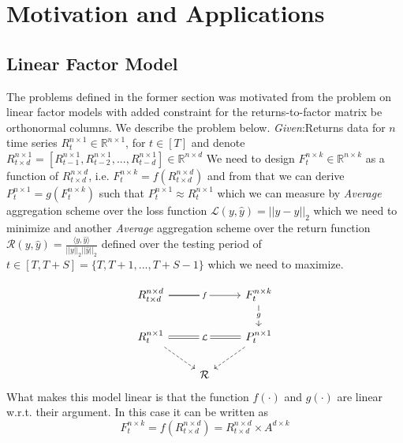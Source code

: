 \section{Motivation and Applications}

\subsection{Linear Factor Model}
The problems defined in the former section was motivated from the problem on linear factor models with added constraint for the returns-to-factor matrix be orthonormal columns. We describe the problem below.\newline
\textit{Given}:\newline Returns data for $n$ time series $R^{n\times 1}_t \in \mathbb{R}^{n\times 1}$, for $t\in [T]$ \newline
and denote $R^{n\times 1}_{t\times d} = [R^{n\times 1}_{t-1},R^{n\times 1}_{t-2},...,R^{n\times 1}_{t-d}] \in \mathbb{R}^{n\times d}$\newline
We need to design $F^{n\times k}_t \in \mathbb{R}^{n\times k}$ as a function of $R^{n\times d}_{t\times d}$, i.e. $F^{n\times k}_t = f(R^{n\times d}_{t\times d})$ and from that we can derive $P^{n \times 1}_{t} = g(F^{n\times k}_t)$ such that $P^{n \times 1}_{t} \approx R^{n \times 1}_{t}$ which we can measure by \textit{Average} aggregation scheme over the loss function $\mathcal{L}(y,\hat{y}) = ||y-\hat{y}||_2$ which we need to minimize and another \textit{Average} aggregation scheme over the return function $\mathcal{R}(y,\hat{y}) = \frac{\langle y,\hat{y}\rangle}{||y||_2||\hat{y}||_2}$ defined over the testing period of $t \in [T,T+S]= \{T,T+1,...,T+S-1\}$ which we need to maximize.

\begin{equation} \label{lfm_diagram}
\begin{tikzcd}
R^{n\times d}_{t \times d} \arrow[rr, "f" description] \arrow[r, no head]& {}& F^{n\times k}_{t} \arrow[d, "g" description] \\
R^{n\times 1}_t \arrow[rr, "\mathcal{L}" description, Rightarrow, no head] \arrow[rd, dashed] && P^{n \times 1}_{t} \arrow[ld, dashed]\\
& \mathcal{R} &
\end{tikzcd}
\end{equation}
\newline
What makes this model linear is that the function $f(\cdot)$ and $g(\cdot)$ are linear w.r.t. their argument. In this case it can be written as
\begin{equation} \label{f_for_lfm}
F^{n\times k}_t = f(R^{n\times d}_{t\times d}) = R^{n\times d}_{t\times d}\times A^{d\times k}
\end{equation}

